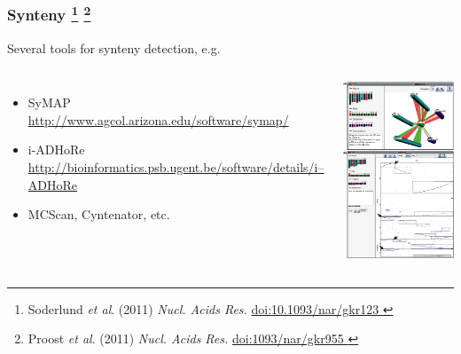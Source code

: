 %
\begin{frame}
  \frametitle{Synteny
    \footnote{\tiny{Soderlund \textit{et al}. (2011) \textit{Nucl. Acids Res.} \href{http://dx.doi.org/10.1093/nar/gkr123}{doi:10.1093/nar/gkr123
  }}}
    \footnote{\tiny{Proost \textit{et al}. (2011) \textit{Nucl. Acids Res.} \href{http://dx.doi.org/10..1093/nar/gkr955}{doi:1093/nar/gkr955
  }}}
}
  Several tools for synteny detection, e.g.
  \begin{columns}[T] 
      \begin{itemize}
        \item \textcolor{hutton_green}{SyMAP {\tiny\href{http://www.agcol.arizona.edu/software/symap/}{http://www.agcol.arizona.edu/software/symap/}}}
        \item \textcolor{hutton_blue}{i-ADHoRe {\tiny\href{http://bioinformatics.psb.ugent.be/software/details/i--ADHoRe}{http://bioinformatics.psb.ugent.be/software/details/i--ADHoRe}}}
        \item MCScan, Cyntenator, etc.  
      \end{itemize}  
        \includegraphics[height=0.6\textheight]{images/symap}
    \end{columns}
\end{frame}

